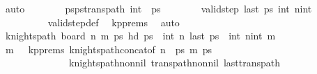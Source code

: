 \begin{isabellebody}
\ auto\isanewline
\ \ \ \ \ \ \isamarkupfalse%
\ {\isacharquery}{\kern0pt}ps{\isacharequal}{\kern0pt}{\isachardoublequoteopen}pstrans{\isacharunderscore}{\kern0pt}path\ {\isacharparenleft}{\kern0pt}{}{\isacharcomma}{\kern0pt}int\ {}{\isacharparenright}{\kern0pt}\ ps\isanewline
\ \ \ \ \ \ \isamarkupfalse%
\ {\isachardoublequoteopen}valid{\isacharunderscore}{\kern0pt}step\ {\isacharparenleft}{\kern0pt}last\ ps\ {\isacharparenleft}{\kern0pt}int\ n{\isacharcomma}{\kern0pt}int\ {}{\isacharplus}{\kern0pt}{}{\isacharparenright}{\kern0pt}{\isachardoublequoteclose}\ \isanewline
\ \ \ \ \ \ \ \ \isamarkupfalse%
\ valid{\isacharunderscore}{\kern0pt}step{\isacharunderscore}{\kern0pt}def\ \isamarkupfalse%
\ kp{\isacharunderscore}{\kern0pt}prems\ \isamarkupfalse%
\ auto\isanewline
\ \ \ \ \ \ \isamarkupfalse%
\ \isamarkupfalse%
\ {\isachardoublequoteopen}knights{\isacharunderscore}{\kern0pt}path\ {\isacharparenleft}{\kern0pt}board\ n\ m{\isacharparenright}{\kern0pt}\ {\isacharquery}{\kern0pt}ps{\isachardoublequoteclose}\ {\isachardoublequoteopen}hd\ {\isacharquery}{\kern0pt}ps\ {\isacharequal}{\kern0pt}\ {\isacharparenleft}{\kern0pt}int\ n{\isacharcomma}{\kern0pt}{}{\isacharparenright}{\kern0pt}{\isachardoublequoteclose}\ {\isachardoublequoteopen}last\ {\isacharquery}{\kern0pt}ps\ {\isacharequal}{\kern0pt}\ {\isacharparenleft}{\kern0pt}int\ n{\isacharminus}{\kern0pt}{}{\isacharcomma}{\kern0pt}int\ m{\isacharminus}{\kern0pt}{}{\isacharparenright}{\kern0pt}{\isachardoublequoteclose}\isanewline
\ \ \ \ \ \ \ \ \isamarkupfalse%
\ {\isacartoucheopen}m\ {\isasymge}\ {}{}{\isacartoucheclose}\ kp{\isacharunderscore}{\kern0pt}prems\ knights{\isacharunderscore}{\kern0pt}path{\isacharunderscore}{\kern0pt}concat{\isacharbrackleft}{\kern0pt}of\ n\ {}\ ps\ {\isachardoublequoteopen}m{\isacharminus}{\kern0pt}{}{\isachardoublequoteclose}\ ps\ \isanewline
\ \ \ \ \ \ \ \ \ \ \ \ \ \ knights{\isacharunderscore}{\kern0pt}path{\isacharunderscore}{\kern0pt}non{\isacharunderscore}{\kern0pt}nil\ trans{\isacharunderscore}{\kern0pt}path{\isacharunderscore}{\kern0pt}non{\isacharunderscore}{\kern0pt}nil\ last{\isacharunderscore}{\kern0pt}trans{\isacharunderscore}{\kern0pt}path\ \isamarkupfalse%

\end{isabellebody}
